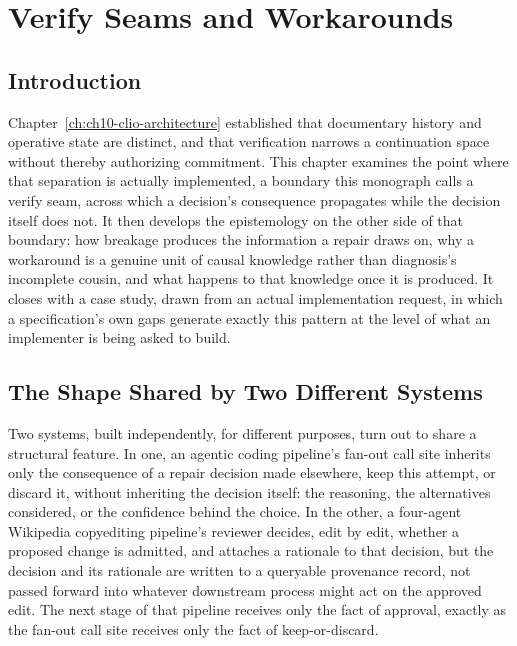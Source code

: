 
\chapter{Verify Seams and Workarounds}
\label{ch:ch12-verify-seams}
\section{Introduction}

Chapter~\ref{ch:ch10-clio-architecture} established that documentary history and operative state are distinct, and that verification narrows a continuation space without thereby authorizing commitment. This chapter examines the point where that separation is actually implemented, a boundary this monograph calls a verify seam, across which a decision's consequence propagates while the decision itself does not. It then develops the epistemology on the other side of that boundary: how breakage produces the information a repair draws on, why a workaround is a genuine unit of causal knowledge rather than diagnosis's incomplete cousin, and what happens to that knowledge once it is produced. It closes with a case study, drawn from an actual implementation request, in which a specification's own gaps generate exactly this pattern at the level of what an implementer is being asked to build.

\section{The Shape Shared by Two Different Systems}

Two systems, built independently, for different purposes, turn out to share a structural feature. In one, an agentic coding pipeline's fan-out call site inherits only the consequence of a repair decision made elsewhere, keep this attempt, or discard it, without inheriting the decision itself: the reasoning, the alternatives considered, or the confidence behind the choice. In the other, a four-agent Wikipedia copyediting pipeline's reviewer decides, edit by edit, whether a proposed change is admitted, and attaches a rationale to that decision, but the decision and its rationale are written to a queryable provenance record, not passed forward into whatever downstream process might act on the approved edit. The next stage of that pipeline receives only the fact of approval, exactly as the fan-out call site receives only the fact of keep-or-discard.

